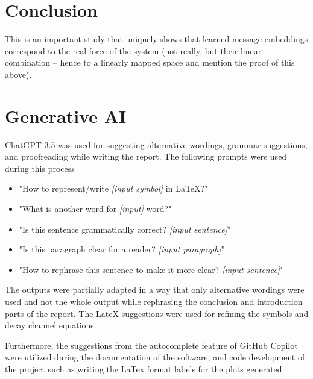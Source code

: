 \documentclass{article}
\begin{document}
\section{Conclusion}
This is an important study that uniquely shows that learned message embeddings correspond to the real force of the system (not really, but their linear combination -- hence to a linearly mapped space and mention the proof of this above).




\appendix
\section{Generative AI}

ChatGPT 3.5 was used for suggesting alternative wordings, grammar suggestions, and proofreading while writing the report. The following prompts were used during this process

\begin{itemize}

  \item "How to represent/write \textit{[input symbol]} in LaTeX?"
  \item "What is another word for \textit{[input]} word?"
  \item "Is this sentence grammatically correct? \textit{[input sentence]}"
  \item "Is this paragraph clear for a reader? \textit{[input paragraph]}"
  \item "How to rephrase this sentence to make it more clear? \textit{[input sentence]}"
\end{itemize}


The outputs were partially adapted in a way that only alternative wordings were used and not the whole output while rephrasing the conclusion and introduction parts of the report. The LateX suggestions were used for refining the symbols and decay channel equations.

Furthermore, the suggestions from the autocomplete feature of GitHub Copilot were utilized during the documentation of the software, and code development of the project such as writing the LaTex format labels for the plots generated.
\end{document}
